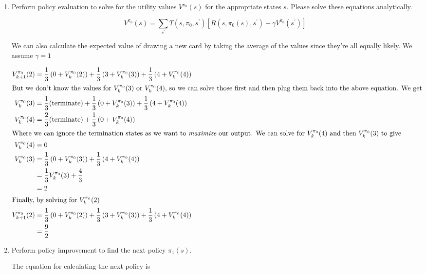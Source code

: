 \documentclass[12pt]{article}
\begin{document}
\begin{enumerate}
\begin{enumerate}
 \item Perform policy evaluation to solve for the utility values
  $V^{\pi_0}(s)$ for the appropriate states $s$.  Please solve these
  equations analytically.

  \[
    V^{\pi_{0}}(s) = \sum_{s^{\prime}}T(s, \pi_{0}, s^{\prime})\left[ R(s, \pi_{0}(s), s^{\prime}) + \gamma V^{\pi_{0}}(s^{\prime}) \right]
  \]

We can also calculate the expected value of drawing a new card by taking the average of the values since they're all equally likely. We assume $\gamma = 1$

\begin{align*}
  V_{k+1}^{\pi_{0}}(2) &= \frac{1}{3}\left(0 + V_{k}^{\pi_{0}}(2)\right) + \frac{1}{3}\left(3 + V_{k}^{\pi_{0}}(3)\right) + \frac{1}{3}\left(4 + V_{k}^{\pi_{0}}(4)\right)\\
\intertext{But we don't know the values for $V_{k}^{\pi_{0}}(3)$ or $V_{k}^{\pi_{0}}(4)$, so we can solve those first and then plug them back into the above equation. We get}
V_{k}^{\pi_{0}}(3) &= \frac{1}{3}(\text{terminate}) + \frac{1}{3}\left(0 + V_{k}^{\pi_{0}}(3)\right) + \frac{1}{3}\left(4 + V_{k}^{\pi_{0}}(4)\right)\\
V_{k}^{\pi_{0}}(4) &= \frac{2}{3}(\text{terminate}) + \frac{1}{3}\left(0 + V_{k}^{\pi_{0}}(4)\right)\\
\intertext{Where we can ignore the termination states as we want to {\em maximize} our output. We can solve for $V_{k}^{\pi_{0}}(4)$ and then $V_{k}^{\pi_{0}}(3)$ to give}
V_{k}^{\pi_{0}}(4) &= 0\\
V_{k}^{\pi_{0}}(3) &= \frac{1}{3}\left( 0 + V_{k}^{\pi_{0}}(3)\right) + \frac{1}{3}\left( 4 + V_{k}^{\pi_{0}}(4)\right)\\
                &= \frac{1}{3}V_{k}^{\pi_{0}}(3) + \frac{4}{3}\\
                &= 2\\
\intertext{Finally, by solving for $V_{k}^{\pi_{0}}(2)$}
V_{k+1}^{\pi_{0}}(2) &= \frac{1}{3}\left( 0 + V_{k}^{\pi_{0}}(2)\right) + \frac{1}{3}\left( 3 + V_{k}^{\pi_{0}}(3)\right) + \frac{1}{3}\left( 4 + V_{k}^{\pi_{0}}(4)\right)\\
                &= \frac{9}{2}
\end{align*}

  \item Perform policy improvement to find the next policy $\pi_1(s)$.

    The equation for calculating the next policy is
    

\end{enumerate}
\end{enumerate}
\end{document}
